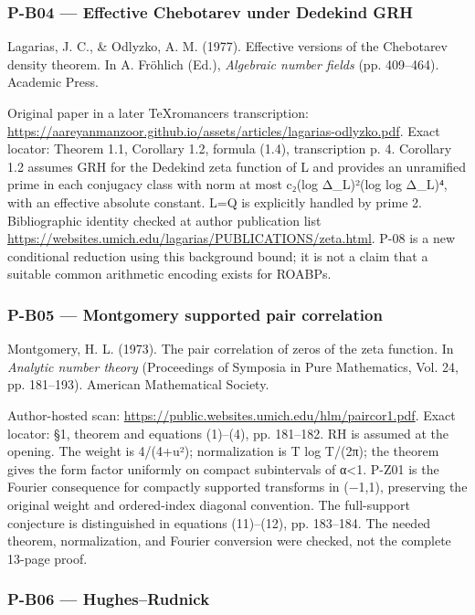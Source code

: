 \documentclass[11pt,a4paper]{article}
\theoremstyle{definition}\newtheorem{definition}{Definition}
\begin{document}
\subsubsection{P-B04 --- Effective Chebotarev under Dedekind
GRH}\label{p-b04--effective-chebotarev-under-dedekind-grh}

Lagarias, J. C., \& Odlyzko, A. M. (1977). Effective versions of the
Chebotarev density theorem. In A. Fröhlich (Ed.), \emph{Algebraic number
fields} (pp. 409--464). Academic Press.

Original paper in a later TeXromancers transcription:
\url{https://aareyanmanzoor.github.io/assets/articles/lagarias-odlyzko.pdf}.
Exact locator: Theorem 1.1, Corollary 1.2, formula (1.4), transcription
p. 4. Corollary 1.2 assumes GRH for the Dedekind zeta function of L and
provides an unramified prime in each conjugacy class with norm at most
c₂(log Δ\_L)²(log log Δ\_L)⁴, with an effective absolute constant. L=Q
is explicitly handled by prime 2. Bibliographic identity checked at
author publication list
\url{https://websites.umich.edu/lagarias/PUBLICATIONS/zeta.html}. P-08
is a new conditional reduction using this background bound; it is not a
claim that a suitable common arithmetic encoding exists for ROABPs.

\subsubsection{P-B05 --- Montgomery supported pair
correlation}\label{p-b05--montgomery-supported-pair-correlation}

Montgomery, H. L. (1973). The pair correlation of zeros of the zeta
function. In \emph{Analytic number theory} (Proceedings of Symposia in
Pure Mathematics, Vol. 24, pp. 181--193). American Mathematical Society.

Author-hosted scan:
\url{https://public.websites.umich.edu/hlm/paircor1.pdf}. Exact locator:
§1, theorem and equations (1)--(4), pp. 181--182. RH is assumed at the
opening. The weight is 4/(4+u²); normalization is T log T/(2π); the
theorem gives the form factor uniformly on compact subintervals of
\textbar α\textbar\textless1. P-Z01 is the Fourier consequence for
compactly supported transforms in (−1,1), preserving the original weight
and ordered-index diagonal convention. The full-support conjecture is
distinguished in equations (11)--(12), pp. 183--184. The needed theorem,
normalization, and Fourier conversion were checked, not the complete
13-page proof.

\subsubsection{P-B06 --- Hughes--Rudnick}\label{p-b06--hughesrudnick}
\end{document}
